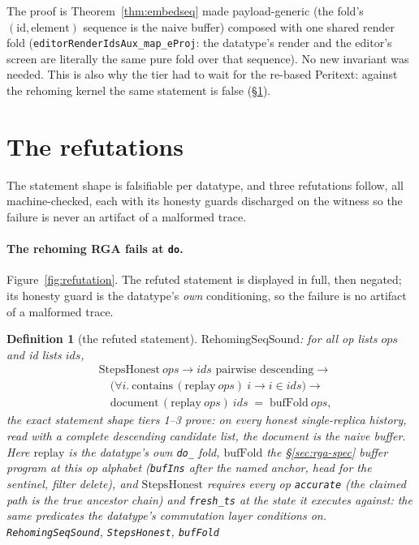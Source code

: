 \documentclass[11pt]{article}
\newtheorem{definition}[theorem]{Definition}
\newcommand{\lean}[1]{\texttt{#1}}
\newcommand{\code}[1]{\texttt{#1}}
\begin{document}
\noindent The proof is Theorem~\ref{thm:embedseq} made
payload-generic (the fold's $(\mathrm{id}, \mathrm{element})$
sequence is the naive buffer) composed with one shared render fold
(\lean{editorRenderIdsAux\_map\_eProj}: the datatype's render and the
editor's screen are literally the same pure fold over that
sequence). No new invariant was needed. This is also why the tier had
to wait for the re-based Peritext: against the rehoming kernel the
same statement is false (\S\ref{sec:refuted}).

\section{The refutations}
\label{sec:refuted}

The statement shape is falsifiable per datatype, and three refutations
follow, all machine-checked, each with its honesty guards discharged
on the witness so the failure is never an artifact of a malformed
trace.

\paragraph{The rehoming RGA fails at \code{do}.}
Figure~\ref{fig:refutation}. The refuted statement is displayed in
full, then negated; its honesty guard is the datatype's \emph{own}
conditioning, so the failure is no artifact of a malformed trace.

\begin{definition}[the refuted statement]
\label{def:rehomingsound}
$\mathrm{RehomingSeqSound}$: for all op lists $\mathit{ops}$ and id
lists $\mathit{ids}$,
\[
\begin{aligned}
  &\mathrm{StepsHonest}\ \mathit{ops} \to
    \mathit{ids} \text{ pairwise descending} \to \\
  &\quad \bigl(\forall i.\
    \mathrm{contains}\,(\mathrm{replay}\ \mathit{ops})\ i \to
    i \in \mathit{ids}\bigr) \to \\
  &\quad \mathrm{document}\,(\mathrm{replay}\ \mathit{ops})\
    \mathit{ids} \;=\; \mathrm{bufFold}\ \mathit{ops} ,
\end{aligned}
\]
the exact statement shape tiers 1--3 prove: on every honest
single-replica history, read with a complete descending candidate
list, the document is the naive buffer. Here $\mathrm{replay}$ is the
datatype's own \code{do\_} fold, $\mathrm{bufFold}$ the
\S\ref{sec:rga-spec} buffer program at this op alphabet
(\lean{bufIns} after the named anchor, head for the sentinel, filter
delete), and $\mathrm{StepsHonest}$ requires every op
\lean{accurate} (the claimed path is the true ancestor chain) and
\lean{fresh\_ts} at the state it executes against: the same
predicates the datatype's commutation layer conditions on.
\hfill\lean{RehomingSeqSound}, \lean{StepsHonest}, \lean{bufFold}
\end{definition}
\end{document}

